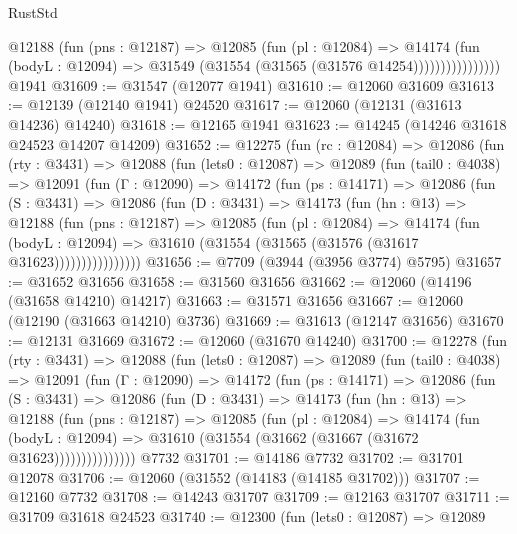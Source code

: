 \begin{lexlean}{RustStd}
\begin{coremodule}
                      @12188
                        (fun (pns : @12187) =>
                        @12085
                          (fun (pl : @12084) =>
                          @14174
                            (fun (bodyL : @12094) =>
                            @31549 (@31554 (@31565 (@31576 @14254))))))))))))))))
    @1941
@31609 := @31547 (@12077 @1941)
@31610 := @12060 @31609
@31613 := @12139 (@12140 @1941) @24520
@31617 := @12060 (@12131 (@31613 @14236) @14240)
@31618 := @12165 @1941
@31623 := @14245 (@14246 @31618 @24523 @14207 @14209)
@31652 := @12275
    (fun (rc : @12084) =>
    @12086
      (fun (rty : @3431) =>
      @12088
        (fun (lets0 : @12087) =>
        @12089
          (fun (tail0 : @4038) =>
          @12091
            (fun (Γ : @12090) =>
            @14172
              (fun (ps : @14171) =>
              @12086
                (fun (S : @3431) =>
                @12086
                  (fun (D : @3431) =>
                  @14173
                    (fun (hn : @13) =>
                    @12188
                      (fun (pns : @12187) =>
                      @12085
                        (fun (pl : @12084) =>
                        @14174
                          (fun (bodyL : @12094) =>
                          @31610 (@31554 (@31565 (@31576 (@31617 @31623))))))))))))))))
@31656 := @7709 (@3944 (@3956 @3774) @5795)
@31657 := @31652 @31656
@31658 := @31560 @31656
@31662 := @12060 (@14196 (@31658 @14210) @14217)
@31663 := @31571 @31656
@31667 := @12060 (@12190 (@31663 @14210) @3736)
@31669 := @31613 (@12147 @31656)
@31670 := @12131 @31669
@31672 := @12060 (@31670 @14240)
@31700 := @12278
    (fun (rty : @3431) =>
    @12088
      (fun (lets0 : @12087) =>
      @12089
        (fun (tail0 : @4038) =>
        @12091
          (fun (Γ : @12090) =>
          @14172
            (fun (ps : @14171) =>
            @12086
              (fun (S : @3431) =>
              @12086
                (fun (D : @3431) =>
                @14173
                  (fun (hn : @13) =>
                  @12188
                    (fun (pns : @12187) =>
                    @12085
                      (fun (pl : @12084) =>
                      @14174
                        (fun (bodyL : @12094) =>
                        @31610 (@31554 (@31662 (@31667 (@31672 @31623)))))))))))))))
    @7732
@31701 := @14186 @7732
@31702 := @31701 @12078
@31706 := @12060 (@31552 (@14183 (@14185 @31702)))
@31707 := @12160 @7732
@31708 := @14243 @31707
@31709 := @12163 @31707
@31711 := @31709 @31618 @24523
@31740 := @12300
    (fun (lets0 : @12087) =>
    @12089

\end{coremodule}
\end{lexlean}
